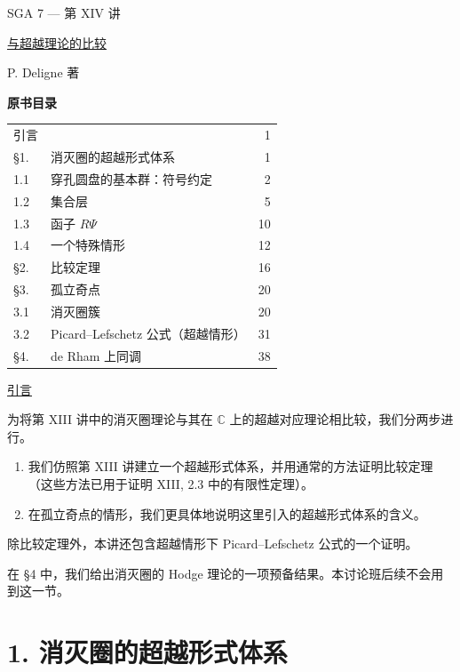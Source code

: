 \clearpage
\ExposeTOC
\begin{center}
{\large SGA 7 --- 第 XIV 讲}\par
\vspace{2em}
{\Large\underline{与超越理论的比较}}\par
\vspace{1.5em}
{\large P. Deligne 著}
\end{center}

\medskip
\noindent\textbf{原书目录}
\begin{center}
\begin{tabular}{@{}llr@{}}
引言 && 1\\
\S1. & 消灭圈的超越形式体系 & 1\\
1.1 & 穿孔圆盘的基本群：符号约定 & 2\\
1.2 & 集合层 & 5\\
1.3 & 函子 $R\Psi$ & 10\\
1.4 & 一个特殊情形 & 12\\
\S2. & 比较定理 & 16\\
\S3. & 孤立奇点 & 20\\
3.1 & 消灭圈簇 & 20\\
3.2 & Picard--Lefschetz 公式（超越情形） & 31\\
\S4. & de Rham 上同调 & 38
\end{tabular}
\end{center}

\medskip
\underline{引言}

为将第 XIII 讲中的消灭圈理论与其在 $\mathbb C$ 上的超越对应理论相比较，我们分两步进行。

\begin{enumerate}[label=(\alph*),leftmargin=2.6em]
\item 我们仿照第 XIII 讲建立一个超越形式体系，并用通常的方法证明比较定理（这些方法已用于证明 XIII, 2.3 中的有限性定理）。

\item 在孤立奇点的情形，我们更具体地说明这里引入的超越形式体系的含义。
\end{enumerate}

除比较定理外，本讲还包含超越情形下 Picard--Lefschetz 公式的一个证明。

在 \S4 中，我们给出消灭圈的 Hodge 理论的一项预备结果。本讨论班后续不会用到这一节。

\section*{1. 消灭圈的超越形式体系}

